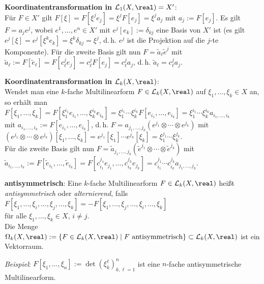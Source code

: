 \textbf{Koordinatentransformation in $\L_1(X, \real) = X'$}: \\
Für $F \in X'$ gilt $F[\xi] = F[\xi^j e_j] = \xi^j F[e_j] = \xi^j a_j$
mit $a_j := F[e_j]$.
Es gilt $F = a_j e^j$, wobei $e^1, \dotsc, e^n \in X'$ mit
$e^j[e_k] := \delta_{kj}$ eine Basis von $X'$ ist
(es gilt $e^j[\xi] = e^j[\xi^k e_k] = \xi^k \delta_{kj} = \xi^j$, d.\,h.
$e^j$ ist die Projektion auf die $j$-te Komponente).
Für die zweite Basis gilt nun $F = \widetilde{a}_\ell \widetilde{e}^j$ mit
$\widetilde{a}_\ell := F[\widetilde{e}_\ell] = F[c_\ell^j e_j] =
c_\ell^j F[e_j] = c_\ell^j a_j$, d.\,h.
$\widetilde{a}_\ell = c_\ell^j a_j$.

\textbf{Koordinatentransformation in $\L_k(X, \real)$}: \\
Wendet man eine $k$-fache Multilinearform $F \in \L_k(X, \real)$ auf
$\xi_1, \dotsc, \xi_k \in X$ an, so erhält man
$F[\xi_1, \dotsc, \xi_k] =
F[\xi_1^{i_1} e_{i_1}, \dotsc, \xi_k^{i_k} e_{i_k}] =
\xi_1^{i_1} \dotsm \xi_k^{i_k} F[e_{i_1}, \dotsc, e_{i_k}] =
\xi_1^{i_1} \dotsm \xi_k^{i_k} a_{i_1, \dotsc, i_k}$ \\
mit $a_{i_1, \dotsc, i_k} := F[e_{i_1}, \dotsc, e_{i_k}]$, d.\,h.
$F = a_{j_1, \dotsc, j_k} (e^{j_1} \otimes \dotsb \otimes e^{j_k})$ mit \\
$(e^{j_1} \otimes \dotsb \otimes e^{j_k})[\xi_1, \dotsc, \xi_k] =
e^{j_1}[\xi_1] \dotsm e^{j_k}[\xi_k] =
\xi_1^{j_1} \dotsm \xi_k^{j_k}$. \\
Für die zweite Basis gilt nun
$F = \widetilde{a}_{j_1, \dotsc, j_k}
(\widetilde{e}^{j_1} \otimes \dotsb \otimes \widetilde{e}^{j_k})$ mit \\
$\widetilde{a}_{i_1, \dotsc, i_k} :=
F[\widetilde{e}_{i_1}, \dotsc, \widetilde{e}_{i_k}] =
F[c_{i_1}^{j_1} e_{j_1}, \dotsc, c_{i_k}^{j_k} e_{j_k}] =
c_{i_1}^{j_1} \dotsm c_{i_k}^{j_k} a_{j_1, \dotsc, j_k}$.

\linie

\textbf{antisymmetrisch}:
Eine $k$-fache Multilinearform $F \in \L_k(X, \real)$ heißt
\emph{antisymmetrisch} oder \emph{alternierend}, falls
$F[\xi_1, \dotsc, \xi_i, \dotsc, \xi_j, \dotsc, \xi_k] =
-F[\xi_1, \dotsc, \xi_j, \dotsc, \xi_i, \dotsc, \xi_k]$ \\
für alle $\xi_1, \dotsc, \xi_k \in X$, $i \not= j$. \\
Die Menge $\Omega_k(X, \real) :=
\{F \in \L_k(X, \real) \;|\; F \text{ antisymmetrisch}\}
\subset \L_k(X, \real)$ ist ein Vektorraum.

\emph{Beispiel}:
$F[\xi_1, \dotsc, \xi_n] := \det(\xi_k^\ell)_{k,\ell=1}^n$ ist eine $n$-fache
antisymmetrische Multilinearform.

